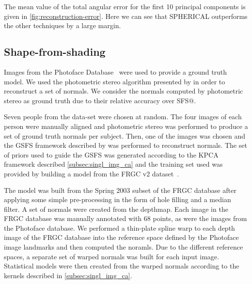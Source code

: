 The mean value of the total angular error for the first 10 principal 
components is given in \cref{fig:reconstruction-error}. Here we can 
see that SPHERICAL outperforms the other techniques by a large margin.
\subsection{Shape-from-shading}
Images from the Photoface Database~\cite{zafeiriou2013photoface} were used to provide a 
ground truth model. We used the photometric stereo algorithm presented by 
\citet{barsky2003foursource} in order to reconstruct a set of normals. 
We consider the normals computed by photometric stereo as ground truth due to 
their relative accuracy over SFS@.

Seven people from the data-set were chosen at random. The four images of each 
person were manually aligned and photometric stereo was performed to produce a
set of ground truth normals per subject. Then, one of the images was chosen 
and the GSFS framework described by \citet{smith2006recovering,smith2008facial}
was performed to reconstruct normals. The set of priors used to guide the GSFS 
was generated according to the KPCA framework described 
\cref{subsec:singl_img_ca} and the training set used was provided by 
building a model from the FRGC v2 dataset~\cite{phillips2005overview}.

The model was built from the Spring 2003 subset of the FRGC database after 
applying some simple pre-processing in the form of hole filling and a median 
filter. A set of normals were created from the depthmap. Each image in the FRGC 
database was manually annotated with 68 points, as were the images from the 
Photoface database. We performed a thin-plate spline warp to each depth image 
of the FRGC database into the reference space defined 
by the Photoface image landmarks and then computed the noramls. 
Due to the different reference spaces, a 
separate set of warped normals was built for each input image. Statistical 
models were then created from the warped normals according to the kernels 
described in \cref{subsec:singl_img_ca}.

